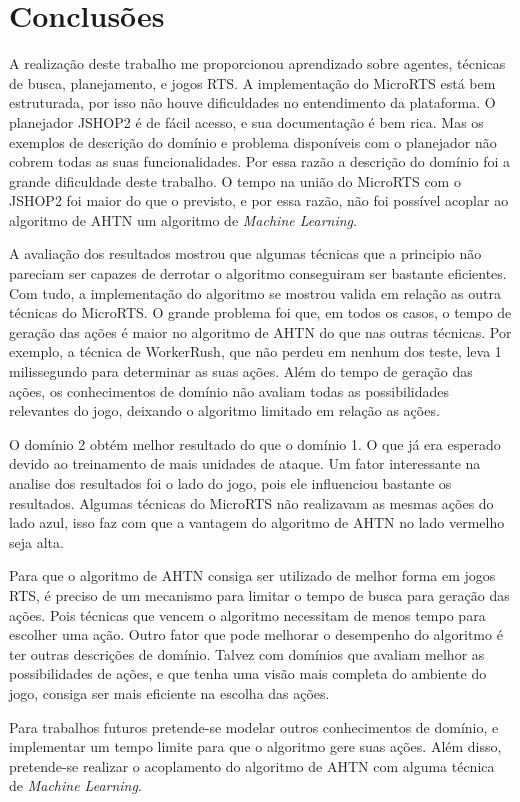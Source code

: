 
\chapter{\label{chap:concl}Conclusões}

A realização deste trabalho me proporcionou aprendizado sobre agentes, técnicas de busca, planejamento, e jogos RTS.
A implementação do MicroRTS está bem estruturada, por isso não houve dificuldades no entendimento da plataforma.
O planejador JSHOP2 é de fácil acesso, e sua documentação é bem rica.
Mas os exemplos de descrição do domínio e problema disponíveis com o planejador não cobrem todas as suas funcionalidades.
Por essa razão a descrição do domínio foi a grande dificuldade deste trabalho.
O tempo na união do MicroRTS com o JSHOP2 foi maior do que o previsto, e por essa razão, não foi possível acoplar ao algoritmo de AHTN um algoritmo de \textit{Machine Learning}.

A avaliação dos resultados mostrou que algumas técnicas que a principio não pareciam ser capazes de derrotar o algoritmo conseguiram ser bastante eficientes.
Com tudo, a implementação do algoritmo se mostrou valida em relação as outra técnicas do MicroRTS.
O grande problema foi que, em todos os casos, o tempo de geração das ações é maior no algoritmo de AHTN do que nas outras técnicas.
Por exemplo, a técnica de WorkerRush, que não perdeu em nenhum dos teste, leva 1 milissegundo para determinar as suas ações.
Além do tempo de geração das ações, os conhecimentos de domínio não avaliam todas as possibilidades relevantes do jogo, deixando o algoritmo limitado em relação as ações.

O domínio 2 obtém melhor resultado do que o domínio 1.
O que já era esperado devido ao treinamento de mais unidades de ataque.
Um fator interessante na analise dos resultados foi o lado do jogo, pois ele influenciou bastante os resultados.
Algumas técnicas do MicroRTS não realizavam as mesmas ações do lado azul, isso faz com que a vantagem do algoritmo de AHTN no lado vermelho seja alta.

Para que o algoritmo de AHTN consiga ser utilizado de melhor forma em jogos RTS, é preciso de um mecanismo para limitar o tempo de busca para geração das ações.
Pois técnicas que vencem o algoritmo necessitam de menos tempo para escolher uma ação.
Outro fator que pode melhorar o desempenho do algoritmo é ter outras descrições de domínio.
Talvez com domínios que avaliam melhor as possibilidades de ações, e que tenha uma visão mais completa do ambiente do jogo, consiga ser mais eficiente na escolha das ações. 

Para trabalhos futuros pretende-se modelar outros conhecimentos de domínio, e implementar um tempo limite para que o algoritmo gere suas ações. 
Além disso, pretende-se realizar o acoplamento do algoritmo de AHTN com alguma técnica de \textit{Machine Learning}. 
